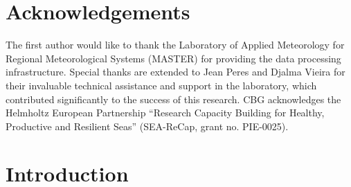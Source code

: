 \documentclass[pdflatex,sn-chicago]{sn-jnl}%
\theoremstyle{plain}
\theoremstyle{definition}
\theoremstyle{remark}
\theoremstyle{definition}
\begin{document}



\maketitle

\section*{Acknowledgements}

The first author would like to thank the Laboratory of Applied Meteorology for Regional Meteorological Systems (MASTER) for providing the data processing infrastructure. Special thanks are extended to Jean Peres and Djalma Vieira for their invaluable technical assistance and support in the laboratory, which contributed significantly to the success of this research. CBG acknowledges the Helmholtz European Partnership “Research Capacity Building for Healthy, Productive and Resilient Seas” (SEA-ReCap, grant no. PIE-0025).

\section{Introduction}\label{sec1}

\end{document}

